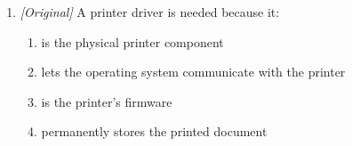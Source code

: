 \begin{enumerate}[label=\textbf{Q\arabic*.}, leftmargin=*]
\begin{enumerate}[label=\Alph*.]
    \item hardware
    \item software
    \item firmware
    \item humanware
  \end{enumerate}
\item \textit{[Original]} A printer driver is needed because it:
  \begin{enumerate}[label=\Alph*.]
    \item is the physical printer component
    \item lets the operating system communicate with the printer
    \item is the printer's firmware
    \item permanently stores the printed document
  \end{enumerate}


\end{enumerate}

